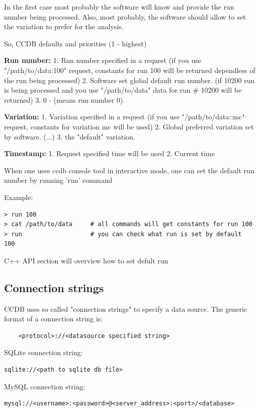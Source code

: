 \documentclass{article}
\begin{document}
In the first case most probably the software will know and provide the run
number being processed. Also, most probably, the software should allow to set
the variation to prefer for the analysis.

So, CCDB defaults and priorities (1 - highest)

\textbf{Run number:}
1. Run number specified in a request
(if you use "/path/to/data:100" request, constants for run 100 will be returned
dependless of the run being processed)
2. Software set global default run number.
(if 10200 run is being processed and you use "/path/to/data" data for run \#
 10200 will be returned)
3. 0 - (means run number 0).

\textbf{Variation:}
1. Variation specified in a request
(if you use "/path/to/data::mc" request, constants for variation mc will be used)
2. Global preferred variation set by software.
(...)
3. the "default" variation.


\textbf{Timestamp:}
1. Request specified time will be used
2. Current time

When one uses ccdb console tool in interactive mode, one can set the default run number by running 'run' command

Example:
\begin{verbatim}
> run 100
> cat /path/to/data     # all commands will get constants for run 100
> run                   # you can check what run is set by default
100
\end{verbatim}
C++ API section will overview how to set defult run


\subsection{Connection strings}\label{sec:connection}


CCDB uses so called "connection strings" to specify a data source.
The generic format of a connection string is:
\begin{verbatim}
    <protocol>://<datasource specified string>
\end{verbatim}

SQLite connection string:
\begin{verbatim}
sqlite://<path to sqlite db file>
\end{verbatim}

MySQL connection string:
\begin{verbatim}
mysql://<username>:<password>@<server_address>:<port>/<database>
\end{verbatim}
\end{document}
